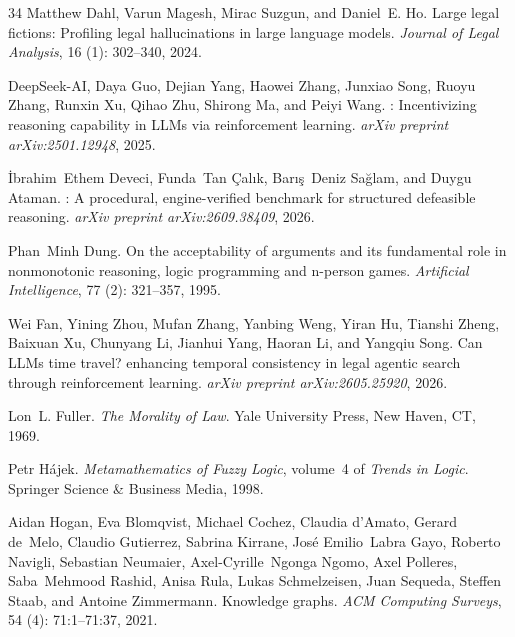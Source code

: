 \documentclass[11pt,a4paper]{article}
\begin{document}
\begin{thebibliography}{34}
Matthew Dahl, Varun Magesh, Mirac Suzgun, and Daniel~E. Ho.
\newblock Large legal fictions: Profiling legal hallucinations in large
  language models.
\newblock \emph{Journal of Legal Analysis}, 16 (1): 302--340,
  2024.

{DeepSeek-AI}, Daya Guo, Dejian Yang, Haowei Zhang, Junxiao Song, Ruoyu Zhang,
  Runxin Xu, Qihao Zhu, Shirong Ma, and Peiyi Wang.
: Incentivizing reasoning capability in {LLMs} via
  reinforcement learning.
\newblock \emph{arXiv preprint arXiv:2501.12948}, 2025.

\.{I}brahim~Ethem Deveci, Funda~Tan \c{C}al{\i}k, Bar{\i}\c{s}~Deniz Sa\u{g}lam, and Duygu Ataman.
: A procedural, engine-verified benchmark for structured defeasible reasoning.
\newblock \emph{arXiv preprint arXiv:2609.38409}, 2026.

Phan~Minh Dung.
\newblock On the acceptability of arguments and its fundamental role in
  nonmonotonic reasoning, logic programming and n-person games.
\newblock \emph{Artificial Intelligence}, 77 (2): 321--357,
  1995.

Wei Fan, Yining Zhou, Mufan Zhang, Yanbing Weng, Yiran Hu, Tianshi Zheng,
  Baixuan Xu, Chunyang Li, Jianhui Yang, Haoran Li, and Yangqiu Song.
\newblock Can {LLMs} time travel? enhancing temporal consistency in legal
  agentic search through reinforcement learning.
\newblock \emph{arXiv preprint arXiv:2605.25920}, 2026.

Lon~L. Fuller.
\newblock \emph{The Morality of Law}.
\newblock Yale University Press, New Haven, CT, 1969.

Petr H{\'a}jek.
\newblock \emph{Metamathematics of Fuzzy Logic}, volume~4 of \emph{Trends in
  Logic}.
\newblock Springer Science \& Business Media, 1998.

Aidan Hogan, Eva Blomqvist, Michael Cochez, Claudia d'Amato, Gerard de~Melo,
  Claudio Gutierrez, Sabrina Kirrane, Jos{\'e} Emilio~Labra Gayo, Roberto
  Navigli, Sebastian Neumaier, Axel-Cyrille~Ngonga Ngomo, Axel Polleres,
  Saba~Mehmood Rashid, Anisa Rula, Lukas Schmelzeisen, Juan Sequeda, Steffen
  Staab, and Antoine Zimmermann.
\newblock Knowledge graphs.
\newblock \emph{ACM Computing Surveys}, 54 (4): 71:1--71:37,
  2021.


\end{thebibliography}
\end{document}
